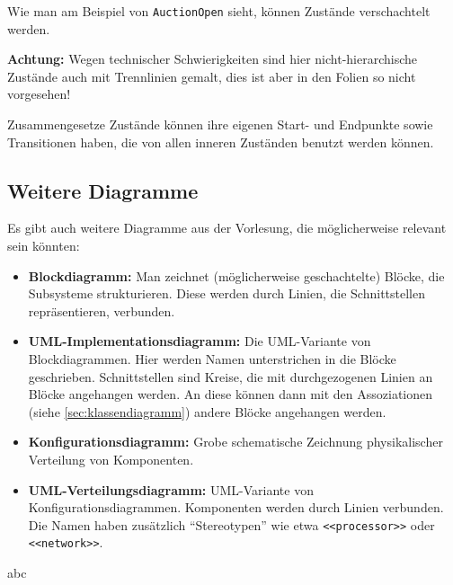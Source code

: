 \documentclass[a4paper,parskip=half*,DIV=7,fontsize=11pt]{scrartcl}
\begin{document}

Wie man am Beispiel von \lstinline{AuctionOpen} sieht, können Zustände verschachtelt werden.

\textbf{Achtung:} Wegen technischer Schwierigkeiten sind hier nicht-hierarchische Zustände auch mit Trennlinien gemalt, dies ist aber in den Folien so nicht vorgesehen!

Zusammengesetze Zustände können ihre eigenen Start- und Endpunkte sowie Transitionen haben, die von allen inneren Zuständen benutzt werden können.

\subsection{Weitere Diagramme}

Es gibt auch weitere Diagramme aus der Vorlesung, die möglicherweise relevant sein könnten:

\begin{itemize}
\item \textbf{Blockdiagramm:} Man zeichnet (möglicherweise geschachtelte) Blöcke, die Subsysteme strukturieren. Diese werden durch Linien, die Schnittstellen repräsentieren, verbunden.
\item \textbf{UML-Implementationsdiagramm:} Die UML-Variante von Blockdiagrammen. Hier werden Namen unterstrichen in die Blöcke geschrieben. Schnittstellen sind Kreise, die mit durchgezogenen Linien an Blöcke angehangen werden. An diese können dann mit den Assoziationen (siehe \ref{sec:klassendiagramm}) andere Blöcke angehangen werden.
\item \textbf{Konfigurationsdiagramm:} Grobe schematische Zeichnung physikalischer Verteilung von Komponenten.
\item \textbf{UML-Verteilungsdiagramm:} UML-Variante von Konfigurationsdiagrammen. Komponenten werden durch Linien verbunden. Die Namen haben zusätzlich ``Stereotypen'' wie etwa \lstinline{<<processor>>} oder \lstinline{<<network>>}.
\end{itemize}
abc
\end{document}
